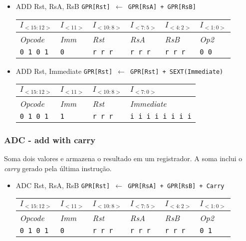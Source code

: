 \documentclass{extreport}
\begin{document}
\begin{itemize}
\item ADD Rst, RsA, RsB
\subitem \texttt{GPR[Rst] $\leftarrow$ GPR[RsA] + GPR[RsB]}
\begin{table}[ht!]
\centering
\begin{tabular}{|p{1.6cm}|p{1.6cm}|p{1.6cm}|p{1.6cm}|p{1.6cm}|p{1.6cm}|}
\hline
$I_{<15:12>}$ & $I_{<11>}$ & $I_{<10:8>}$ & $I_{<7:5>}$ & $I_{<4:2>}$ & $I_{<1:0>}$ \\ \hline
\textit{Opcode} & \textit{Imm} & \textit{Rst} & \textit{RsA} & \textit{RsB} & \textit{Op2} \\ \hline
\texttt{0 1 0 1} & \texttt{0} & \texttt{r r r} & \texttt{r r r} & \texttt{r r r} & \texttt{0 0} \\ \hline
\end{tabular}
\end{table}

\item ADD Rst, Immediate
\subitem \texttt{GPR[Rst] $\leftarrow$ GPR[Rst] + SEXT(Immediate)}
\begin{table}[ht!]
\centering
\begin{tabular}{|p{1.6cm}|p{1.6cm}|p{1.6cm}|p{5.65cm}|}
\hline
$I_{<15:12>}$ & $I_{<11>}$ & $I_{<10:8>}$ & $I_{<7:0>}$ \\ \hline
\textit{Opcode} & \textit{Imm} & \textit{Rst} & \textit{Immediate} \\ \hline
\texttt{0 1 0 1} & \texttt{1} & \texttt{r r r} & \texttt{i i i i i i i i} \\ \hline
\end{tabular}
\end{table}
\end{itemize}

\subsubsection{ADC - add with carry}
Soma dois valores e armazena o resultado em um registrador. A soma inclui o \textit{carry} gerado pela última instrução.

\begin{itemize}
\item ADC Rst, RsA, RsB
\subitem \texttt{GPR[Rst] $\leftarrow$ GPR[RsA] + GPR[RsB] + Carry}
\begin{table}[ht!]
\centering
\begin{tabular}{|p{1.6cm}|p{1.6cm}|p{1.6cm}|p{1.6cm}|p{1.6cm}|p{1.6cm}|}
\hline
$I_{<15:12>}$ & $I_{<11>}$ & $I_{<10:8>}$ & $I_{<7:5>}$ & $I_{<4:2>}$ & $I_{<1:0>}$ \\ \hline
\textit{Opcode} & \textit{Imm} & \textit{Rst} & \textit{RsA} & \textit{RsB} & \textit{Op2} \\ \hline
\texttt{0 1 0 1} & \texttt{0} & \texttt{r r r} & \texttt{r r r} & \texttt{r r r} & \texttt{0 1} \\ \hline
\end{tabular}
\end{table}
\end{itemize}
\end{document}
